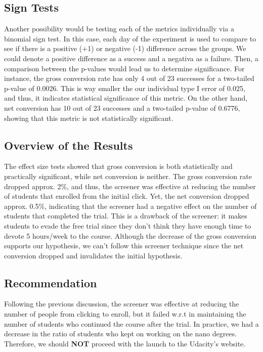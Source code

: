 \documentclass[11pt]{article}
\begin{document}
	\subsection{Sign Tests}

		Another possibility would be testing each of the metrics individually via a binomial sign test.
		In this case, each day of the experiment is used to compare to see if there is a positive (+1) or negative (-1) difference across the groups.
		We could denote a positive difference as a success and a negativa as a failure.
		Then, a comparison between the p-values would lead us to determine significance.
		For instance, the gross conversion rate has only 4 out of 23 successes for a two-tailed p-value of 0.0026.
		This is way smaller the our individual type I error of 0.025, and thus, it indicates statistical significance of this metric.
		On the other hand, net conversion has 10 out of 23 successes and a two-tailed p-value of 0.6776, showing that this metric is not statistically significant.
	

	\subsection{Overview of the Results}
		The effect size tests showed that gross conversion is both statistically and practically significant, while net conversion is neither.
		The gross conversion rate dropped approx. 2\%, and thus, the screener was effective at reducing the number of students that enrolled from the initial click.
		Yet, the net conversion dropped approx. 0.5\%, indicating that the screener had a negative effect on the number of students that completed the trial.
		This is a drawback of the screener: it makes students to evade the free trial since they don't think they have enough time to devote 5 hours/week to the course.
		Although the decrease of the gross conversion supports our hypothesis, we can't follow this screener technique since the net conversion dropped and invalidates the initial hypothesis.
	
	\subsection{Recommendation}
	
		Following the previous discussion, the screener was effective at reducing the number of people from clicking to enroll, but it failed w.r.t in maintaining the number of students who continued the course after the trial.
		In practice, we had a decrease in the ratio of students who kept on working on the nano degrees.
		Therefore, we should \textbf{NOT} proceed with the launch to the Udacity’s website.
\end{document}
